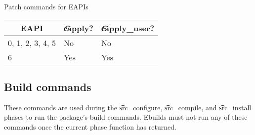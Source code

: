 \begin{centertable}{Patch commands for EAPIs}
    \label{tab:patch-commands}
    \begin{tabular}{lll}
      \toprule
      \multicolumn{1}{c}{\textbf{EAPI}} &
      \multicolumn{1}{c}{\textbf{\t{eapply}?}} &
      \multicolumn{1}{c}{\textbf{\t{eapply_user}?}} \\
      \midrule
      0, 1, 2, 3, 4, 5  & No  & No  \\
      6                 & Yes & Yes \\
      \bottomrule
    \end{tabular}
\end{centertable}

\subsection{Build commands}
These commands are used during the \t{src_configure}, \t{src_compile}, and \t{src_install}
phases to run the package's build commands. Ebuilds must not run any of these commands once the
current phase function has returned.

